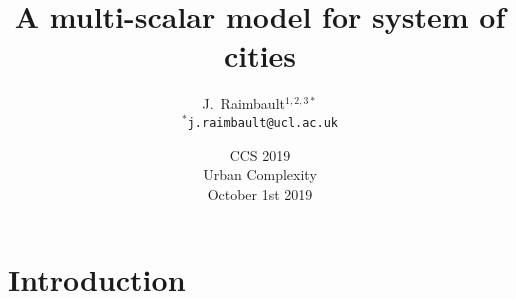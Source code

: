 



\title[Multiscale urban growth]{A multi-scalar model for system of cities}
\author[Raimbault]{J.~Raimbault$^{1,2,3\ast}$\\\medskip
$^{\ast}$\texttt{j.raimbault@ucl.ac.uk}
}



\date[1st October 2019]{CCS 2019\\
Urban Complexity\\
October 1st 2019
}

\frame{\maketitle}





\section{Introduction}







